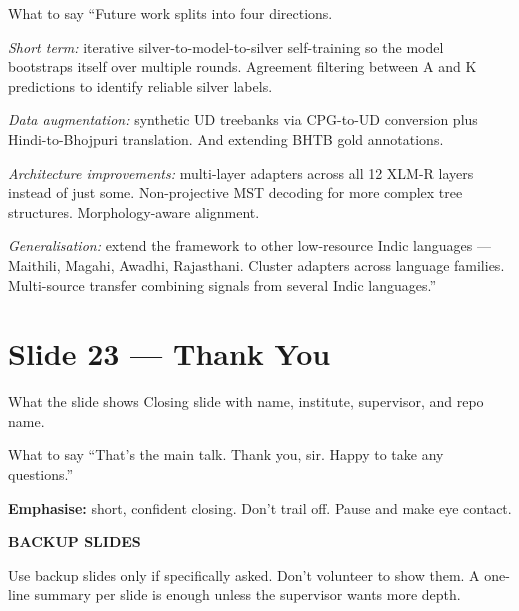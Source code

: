 \documentclass[11pt]{article}
\begin{document}
\begin{pitchbox}{What to say}
``Future work splits into four directions.

\textit{Short term:} iterative silver-to-model-to-silver self-training so the model bootstraps itself over multiple rounds. Agreement filtering between A and K predictions to identify reliable silver labels.

\textit{Data augmentation:} synthetic UD treebanks via CPG-to-UD conversion plus Hindi-to-Bhojpuri translation. And extending BHTB gold annotations.

\textit{Architecture improvements:} multi-layer adapters across all 12 XLM-R layers instead of just some. Non-projective MST decoding for more complex tree structures. Morphology-aware alignment.

\textit{Generalisation:} extend the framework to other low-resource Indic languages --- Maithili, Magahi, Awadhi, Rajasthani. Cluster adapters across language families. Multi-source transfer combining signals from several Indic languages.''
\end{pitchbox}

\section{Slide 23 --- Thank You}

\begin{pitchbox}{What the slide shows}
Closing slide with name, institute, supervisor, and repo name.
\end{pitchbox}

\begin{pitchbox}{What to say}
``That's the main talk. Thank you, sir. Happy to take any questions.''
\end{pitchbox}

\begin{tipbox}
\textbf{Emphasise:} short, confident closing. Don't trail off. Pause and make eye contact.
\end{tipbox}

\clearpage

\begin{center}
{\LARGE\bfseries\color{accent}BACKUP SLIDES}
\end{center}

\vspace{0.2cm}
\begin{tipbox}
Use backup slides only if specifically asked. Don't volunteer to show them. A one-line summary per slide is enough unless the supervisor wants more depth.
\end{tipbox}
\end{document}
